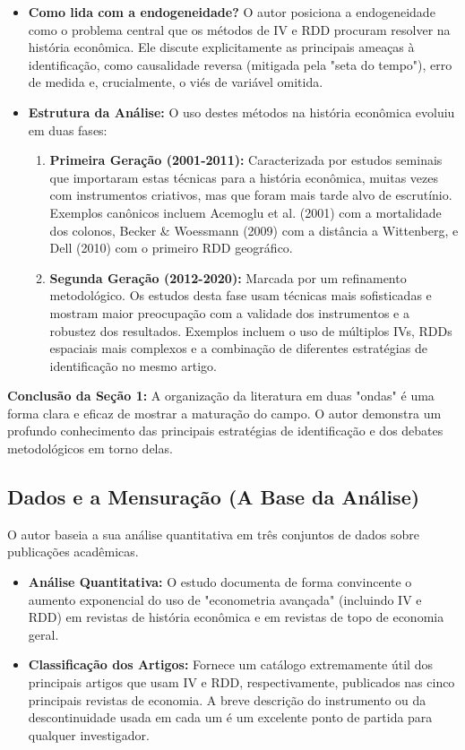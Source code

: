 \documentclass[12pt, a4paper]{article}
\begin{document}
\begin{itemize}
    \item \textbf{Como lida com a endogeneidade?} O autor posiciona a endogeneidade como o problema central que os métodos de IV e RDD procuram resolver na história econômica. Ele discute explicitamente as principais ameaças à identificação, como causalidade reversa (mitigada pela "seta do tempo"), erro de medida e, crucialmente, o viés de variável omitida.

    \item \textbf{Estrutura da Análise:} O uso destes métodos na história econômica evoluiu em duas fases:
    \begin{enumerate}
        \item \textbf{Primeira Geração (2001-2011):} Caracterizada por estudos seminais que importaram estas técnicas para a história econômica, muitas vezes com instrumentos criativos, mas que foram mais tarde alvo de escrutínio. Exemplos canônicos incluem Acemoglu et al. (2001) com a mortalidade dos colonos, Becker \& Woessmann (2009) com a distância a Wittenberg, e Dell (2010) com o primeiro RDD geográfico.
        \item \textbf{Segunda Geração (2012-2020):} Marcada por um refinamento metodológico. Os estudos desta fase usam técnicas mais sofisticadas e mostram maior preocupação com a validade dos instrumentos e a robustez dos resultados. Exemplos incluem o uso de múltiplos IVs, RDDs espaciais mais complexos e a combinação de diferentes estratégias de identificação no mesmo artigo.
    \end{enumerate}
\end{itemize}

\noindent\textbf{Conclusão da Seção 1:} A organização da literatura em duas "ondas" é uma forma clara e eficaz de mostrar a maturação do campo. O autor demonstra um profundo conhecimento das principais estratégias de identificação e dos debates metodológicos em torno delas.

\subsection{Dados e a Mensuração (A Base da Análise)}
O autor baseia a sua análise quantitativa em três conjuntos de dados sobre publicações acadêmicas.
\begin{itemize}
    \item \textbf{Análise Quantitativa:} O estudo documenta de forma convincente o aumento exponencial do uso de "econometria avançada" (incluindo IV e RDD) em revistas de história econômica e em revistas de topo de economia geral.
    \item \textbf{Classificação dos Artigos:} Fornece um catálogo extremamente útil dos principais artigos que usam IV e RDD, respectivamente, publicados nas cinco principais revistas de economia. A breve descrição do instrumento ou da descontinuidade usada em cada um é um excelente ponto de partida para qualquer investigador.
\end{itemize}
\end{document}
